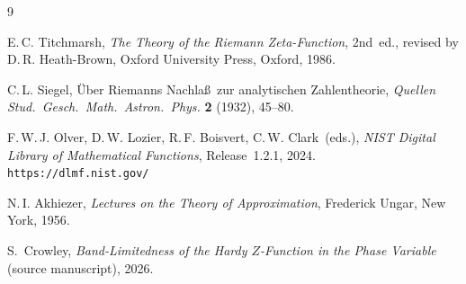 \documentclass[12pt]{amsart}
\theoremstyle{definition}
\theoremstyle{remark}
\begin{document}
\begin{thebibliography}{9}

E.\,C. Titchmarsh,
\textit{The Theory of the Riemann Zeta-Function},
2nd~ed., revised by D.\,R. Heath-Brown,
Oxford University Press, Oxford, 1986.

C.\,L. Siegel,
\"{U}ber Riemanns Nachla\ss\ zur analytischen Zahlentheorie,
\textit{Quellen Stud.\ Gesch.\ Math.\ Astron.\ Phys.}
\textbf{2} (1932), 45--80.

F.\,W.\,J. Olver, D.\,W. Lozier, R.\,F. Boisvert, C.\,W. Clark~(eds.),
\textit{NIST Digital Library of Mathematical Functions},
Release~1.2.1, 2024.
\texttt{https://dlmf.nist.gov/}

N.\,I. Akhiezer,
\textit{Lectures on the Theory of Approximation},
Frederick Ungar, New York, 1956.

S.~Crowley,
\textit{Band-Limitedness of the Hardy $Z$-Function in the Phase Variable}
(source manuscript), 2026.

\end{thebibliography}
\end{document}
